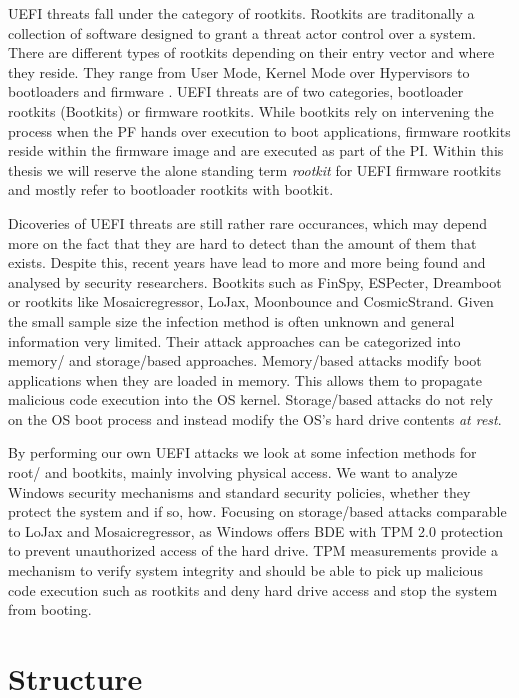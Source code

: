 \ac{UEFI} threats fall under the category of rootkits.
Rootkits are traditonally a collection of software designed to grant a threat actor control over a system.
There are different types of rootkits depending on their entry vector and where they reside.
They range from User Mode, Kernel Mode over Hypervisors to bootloaders and firmware \cite{crowdstrike, techtarget, microsoft-secure-the-windows-boot-process}.
\ac{UEFI} threats are of two categories, bootloader rootkits (Bootkits) or firmware rootkits.
While bootkits rely on intervening the process when the \ac{PF} hands over execution to boot applications, firmware rootkits reside within the firmware image and are executed as part of the \ac{PI}.
Within this thesis we will reserve the alone standing term \emph{rootkit} for \ac{UEFI} firmware rootkits and mostly refer to bootloader rootkits with bootkit.

Dicoveries of \ac{UEFI} threats are still rather rare occurances, which may depend more on the fact that they are hard to detect than the amount of them that exists.
Despite this, recent years have lead to more and more being found and analysed by security researchers.
Bootkits such as FinSpy, ESPecter, Dreamboot or rootkits like Mosaicregressor, LoJax, Moonbounce and CosmicStrand.
Given the small sample size the infection method is often unknown and general information very limited.
Their attack approaches can be categorized into memory\-/ and storage\-/based approaches.
Memory\-/based attacks modify boot applications when they are loaded in memory.
This allows them to propagate malicious code execution into the \ac{OS} kernel.
Storage\-/based attacks do not rely on the \ac{OS} boot process and instead modify the \ac{OS}'s hard drive contents \emph{at rest}.

By performing our own \ac{UEFI} attacks we look at some infection methods for root\-/ and bootkits, mainly involving physical access.
We want to analyze Windows security mechanisms and standard security policies, whether they protect the system and if so, how.
Focusing on storage\-/based attacks comparable to LoJax and Mosaicregressor, as Windows offers \ac{BDE} with \ac{TPM} 2.0 protection to prevent unauthorized access of the hard drive.
\ac{TPM} measurements provide a mechanism to verify system integrity and should be able to pick up malicious code execution such as rootkits and deny hard drive access and stop the system from booting.

\section*{Structure}

